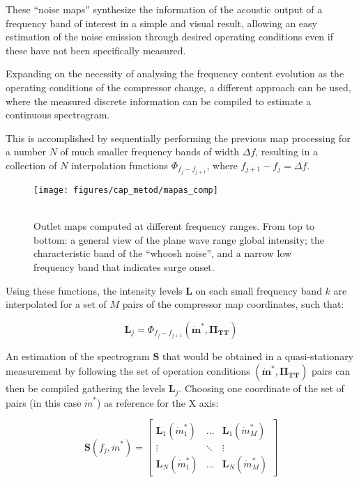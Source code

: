 These ``noise maps'' synthesize the information of the acoustic output of a frequency band of interest in a simple and visual result, allowing an easy estimation of the noise emission through desired operating conditions even if these have not been specifically measured.

Expanding on the necessity of analysing the frequency content evolution as the operating conditions of the compressor change, a different approach can be used, where the measured discrete information can be compiled to estimate a continuous spectrogram.

This is accomplished by sequentially performing the previous map processing for a number $N$ of much smaller frequency bands of width $\Delta f$, resulting in a collection of $N$ interpolation functions $\Phi_{f_j-f_{j+1}}$, where $f_{j+1}-f_j = \Delta f$.

\begin{wrapfigure}[36]{O}[1.6cm]{0.41\textwidth}
\vspace{-5mm}
\texttt{[image: figures/cap\_metod/mapas\_comp]}
\caption{\null\\Outlet maps computed at different frequency ranges. From top to bottom: a general view of the plane wave range global intensity; the characteristic band of the ``whoosh noise'', and a narrow low frequency band that indicates surge onset.}
\label{fig:mapas_comp}
\end{wrapfigure}

Using these functions, the intensity levels $\mathbf L$ on each small frequency band $k$ are interpolated for a set of $M$ pairs of the compressor map coordinates, such that:

\begin{equation}
 \mathbf L_j=\Phi_{f_j-f_{j+1}}(\mathbf{\dot m^*},\mathbf{\Pi_\text{TT}})
\end{equation}

An estimation of the spectrogram $\mathbf S$ that would be obtained in a quasi-stationary measurement by following the set of operation conditions $(\mathbf{\dot m^*},\mathbf{\Pi_\text{TT}})$ pairs can then be compiled gathering the levels $\mathbf L_j$. Choosing one coordinate of the set of pairs (in this case $\dot m^*$) as reference for the X axis:

\begin{equation}
  \mathbf S(f_j,\dot m^*)=\begin{bmatrix}
    \mathbf L_1(\dot m^*_1) & \hdots & \mathbf L_1(\dot m^*_M)\\
    \vdots & \ddots & \vdots \\
    \mathbf L_N(\dot m^*_1) & \hdots & \mathbf L_N(\dot m^*_M)
  \end{bmatrix}
\end{equation}

